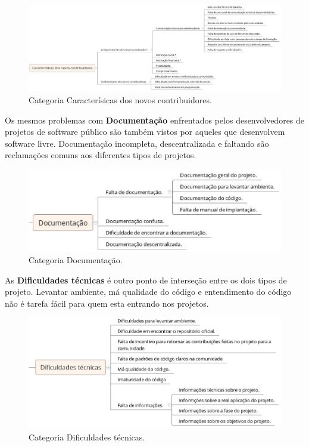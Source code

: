 \begin{figure}[h]
	\centering
	\label{fig:caracteristicas}
		\includegraphics[keepaspectratio=true,scale=0.35]{figuras/caracteristicas.eps}
	\caption{Categoria Caracterísicas dos novos contribuidores.}
\end{figure}

Os mesmos problemas com \textbf{Documentação} enfrentados pelos desenvolvedores de 
projetos de software público são também vistos por aqueles que desenvolvem software 
livre. Documentação incompleta, descentralizada e faltando são reclamações comuns aos
diferentes tipos de projetos.

\begin{figure}[h]
	\centering
	\label{fig:documentacao}
		\includegraphics[keepaspectratio=true,scale=0.5]{figuras/documentacao.eps}
	\caption{Categoria Documentação.}
\end{figure}

As \textbf{Dificuldades técnicas} é outro ponto de interseção entre os dois tipos
de projeto. Levantar ambiente, má qualidade do código e entendimento do código
não é tarefa fácil para quem esta entrando nos projetos.

\begin{figure}[h]
	\centering
	\label{fig:dificuldades}
		\includegraphics[keepaspectratio=true,scale=0.5]{figuras/dificuldades.eps}
	\caption{Categoria Dificuldades técnicas.}
\end{figure}

